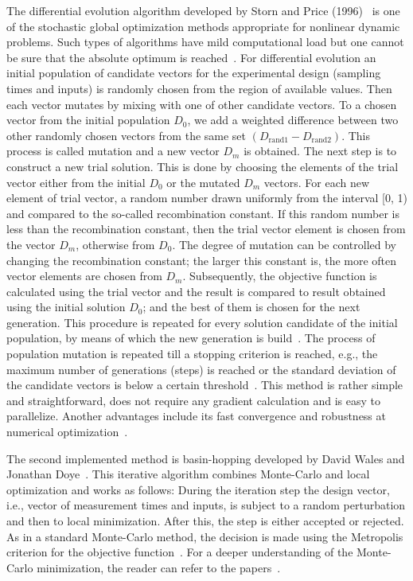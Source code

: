 \documentclass[graybox]{svmult}
\begin{document}
The differential evolution algorithm developed by Storn and Price (1996)~\cite{stornDifferentialEvolutionSimple1997} is one of the stochastic global optimization methods appropriate for nonlinear dynamic problems.
Such types of algorithms have mild computational load but one cannot be sure that the absolute optimum is reached~\cite{balsa-cantoe.bangaj.r.COMPUTINGOPTIMALDYNAMIC2008}.
For differential evolution an initial population of candidate vectors for the experimental design (sampling times and inputs) is randomly chosen from the region of available values.
Then each vector mutates by mixing with one of other candidate vectors.
To a chosen vector from the initial population $D_0$, we add a weighted difference between two other randomly chosen vectors from the same set $(D_\text{rand1} - D_\text{rand2})$.
This process is called mutation and a new vector $D_m$ is obtained.
The next step is to construct a new trial solution.
This is done by choosing the elements of the trial vector either from the initial $D_0$ or the mutated $D_m$ vectors.
For each new element of trial vector, a random number drawn uniformly from the interval [0, 1) and compared to the so-called recombination constant.
If this random number is less than the recombination constant, then the trial vector element is chosen from the vector $D_m$, otherwise from $D_0$.
The degree of mutation can be controlled by changing the recombination constant; the larger this constant is, the more often vector elements are chosen from $D_m$.
Subsequently, the objective function is calculated using the trial vector and the result is compared to result obtained using the initial solution $D_0$; and the best of them is chosen for the next generation.
This procedure is repeated for every solution candidate of the initial population, by means of which the new generation is build~\cite{scipydiffev}.
The process of population mutation is repeated till a stopping criterion is reached, e.g., the maximum number of generations (steps) is reached or the standard deviation of the candidate vectors is below a certain threshold~\cite{Zielinski_DE}.
This method is rather simple and straightforward, does not require any gradient calculation and is easy to parallelize.
Another advantages include its fast convergence and robustness at numerical optimization~\cite{babu_differential_2007}.

The second implemented method is basin-hopping developed by David Wales and Jonathan Doye~\cite{wales_global_1997}.
This iterative algorithm combines Monte-Carlo and local optimization and works as follows:
During the iteration step the design vector, i.e., vector of measurement times and inputs, is subject to a random perturbation and then to local minimization.
After this, the step is either accepted or rejected.
As in a standard Monte-Carlo method, the decision is made using the Metropolis criterion for the objective function~\cite{scipybashop}.
For a deeper understanding of the Monte-Carlo minimization, the reader can refer to the papers~\cite{li_monte_1987, beichl_metropolis_2000}.
\end{document}
